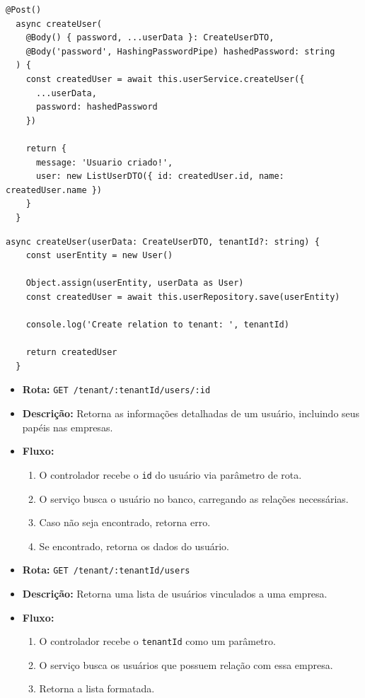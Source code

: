 \begin{lstlisting}[caption={Exemplo de \textit{controller} para criação de usuário.},label={cod:create-user-controller}]
	@Post()
  async createUser(
    @Body() { password, ...userData }: CreateUserDTO,
    @Body('password', HashingPasswordPipe) hashedPassword: string
  ) {
    const createdUser = await this.userService.createUser({
      ...userData,
      password: hashedPassword
    })

    return {
      message: 'Usuario criado!',
      user: new ListUserDTO({ id: createdUser.id, name: createdUser.name })
    }
  }
\end{lstlisting}

\begin{lstlisting}[caption={Exemplo de \textit{service} para criação de usuário.},label={cod:create-user-service}]
	async createUser(userData: CreateUserDTO, tenantId?: string) {
    const userEntity = new User()

    Object.assign(userEntity, userData as User)
    const createdUser = await this.userRepository.save(userEntity)

    console.log('Create relation to tenant: ', tenantId)

    return createdUser
  }
\end{lstlisting}

\begin{itemize}
	\item \textbf{Rota:} \texttt{GET /tenant/:tenantId/users/:id}
	\item \textbf{Descrição:} Retorna as informações detalhadas de um usuário, incluindo seus papéis nas empresas.
	\item \textbf{Fluxo:}
	\begin{enumerate}
		\item O controlador recebe o \texttt{id} do usuário via parâmetro de rota.
		\item O serviço busca o usuário no banco, carregando as relações necessárias.
		\item Caso não seja encontrado, retorna erro.
		\item Se encontrado, retorna os dados do usuário.
	\end{enumerate}
\end{itemize}

\begin{itemize}
	\item \textbf{Rota:} \texttt{GET /tenant/:tenantId/users}
	\item \textbf{Descrição:} Retorna uma lista de usuários vinculados a uma empresa.
	\item \textbf{Fluxo:}
	\begin{enumerate}
		\item O controlador recebe o \texttt{tenantId} como um parâmetro.
		\item O serviço busca os usuários que possuem relação com essa empresa.
		\item Retorna a lista formatada.
	\end{enumerate}
\end{itemize}

